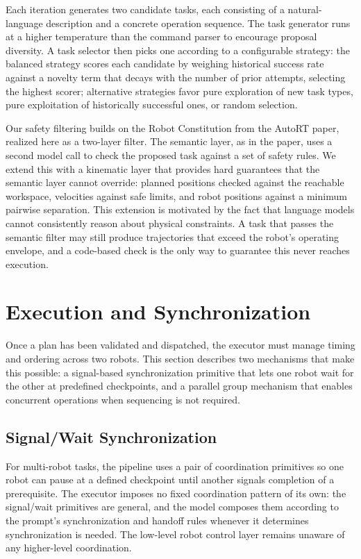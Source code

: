 \documentclass[
     12pt,
     a4paper,
     BCOR=10mm,
     DIV=14,
     listof=totoc,
     bibliography=totoc,
     parskip,
     twoside,
     headsepline
     ]{scrreprt}
\begin{document}
Each iteration generates two candidate tasks, each consisting of a natural-language description and a concrete operation sequence. The task generator runs at a higher temperature than the command parser to encourage proposal diversity. A task selector then picks one according to a configurable strategy: the balanced strategy scores each candidate by weighing historical success rate against a novelty term that decays with the number of prior attempts, selecting the highest scorer; alternative strategies favor pure exploration of new task types, pure exploitation of historically successful ones, or random selection.

Our safety filtering builds on the Robot Constitution from the AutoRT paper, realized here as a two-layer filter. The semantic layer, as in the paper, uses a second model call to check the proposed task against a set of safety rules. We extend this with a kinematic layer that provides hard guarantees that the semantic layer cannot override: planned positions checked against the reachable workspace, velocities against safe limits, and robot positions against a minimum pairwise separation. This extension is motivated by the fact that language models cannot consistently reason about physical constraints. A task that passes the semantic filter may still produce trajectories that exceed the robot's operating envelope, and a code-based check is the only way to guarantee this never reaches execution.

\section{Execution and Synchronization}
Once a plan has been validated and dispatched, the executor must manage timing and ordering across two robots. This section describes two mechanisms that make this possible: a signal-based synchronization primitive that lets one robot wait for the other at predefined checkpoints, and a parallel group mechanism that enables concurrent operations when sequencing is not required.

\subsection{Signal/Wait Synchronization}
For multi-robot tasks, the pipeline uses a pair of coordination primitives so one robot can pause at a defined checkpoint until another signals completion of a prerequisite. The executor imposes no fixed coordination pattern of its own: the signal/wait primitives are general, and the model composes them according to the prompt's synchronization and handoff rules whenever it determines synchronization is needed. The low-level robot control layer remains unaware of any higher-level coordination.
\end{document}
